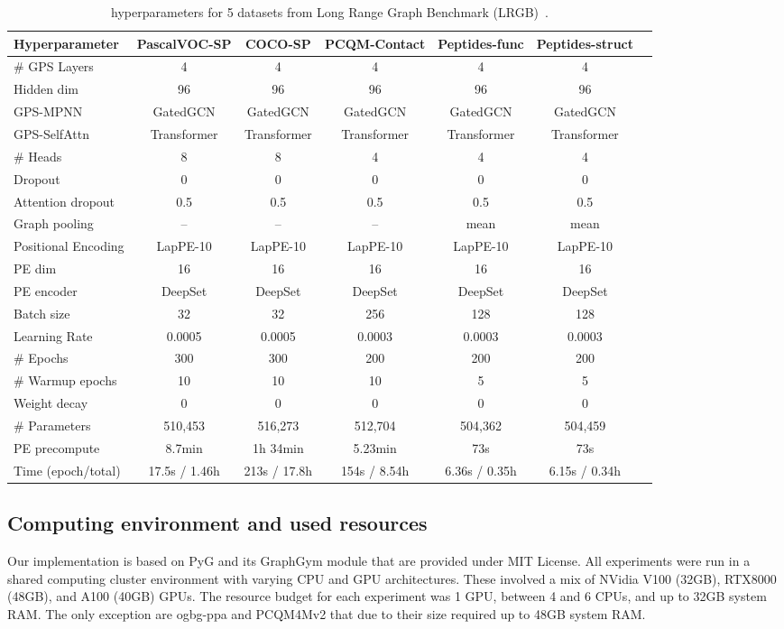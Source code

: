 \documentclass{article}
\begin{document}
\begin{table}[ht]
    \caption{\method hyperparameters for 5 datasets from Long Range Graph Benchmark (LRGB)~\cite{dwivedi2022LRGB}.}
    \label{tab:hparams_lrgb}
    \centering
    \fontsize{8.5pt}{8.5pt}\selectfont
    \begin{tabular}{lcccccc}\toprule
    Hyperparameter &\textbf{PascalVOC-SP} &\textbf{COCO-SP} &\textbf{PCQM-Contact} &\textbf{Peptides-func} &\textbf{Peptides-struct} \\\midrule
    \# GPS Layers &4 &4 &4 &4 &4 \\
    Hidden dim &96 &96 &96 &96 &96 \\
    GPS-MPNN &GatedGCN &GatedGCN &GatedGCN &GatedGCN &GatedGCN \\
    GPS-SelfAttn &Transformer &Transformer &Transformer &Transformer &Transformer \\
    \# Heads &8 &8 &4 &4 &4 \\
    Dropout &0 &0 &0 &0 &0 \\
    Attention dropout &0.5 &0.5 &0.5 &0.5 &0.5 \\
    Graph pooling &-- &-- &-- &mean &mean \\\midrule
    Positional Encoding &LapPE-10 &LapPE-10 &LapPE-10 &LapPE-10 &LapPE-10 \\
    PE dim &16 &16 &16 &16 &16 \\
    PE encoder &DeepSet &DeepSet &DeepSet &DeepSet &DeepSet \\\midrule
    Batch size &32 &32 &256 &128 &128 \\
    Learning Rate &0.0005 &0.0005 &0.0003 &0.0003 &0.0003 \\
    \# Epochs &300 &300 &200 &200 &200 \\
    \# Warmup epochs &10 &10 &10 &5 &5 \\
    Weight decay &0 &0 &0 &0 &0 \\\midrule
    \# Parameters &510,453 &516,273 &512,704 &504,362 &504,459 \\
    PE precompute &8.7min &1h 34min &5.23min &73s &73s \\
    Time (epoch/total) &17.5s / 1.46h &213s / 17.8h &154s / 8.54h &6.36s / 0.35h &6.15s / 0.34h \\
    \bottomrule
    \end{tabular}
\end{table}


\subsection{Computing environment and used resources}\label{app:cluster}
Our implementation is based on PyG and its GraphGym module \cite{FeyLenssen2019PyG,you2020design} that are provided under MIT License. All experiments were run in a shared computing cluster environment with varying CPU and GPU architectures. These involved a mix of NVidia V100 (32GB), RTX8000 (48GB), and A100 (40GB) GPUs. The resource budget for each experiment was 1 GPU, between 4 and 6 CPUs, and up to 32GB system RAM. The only exception are ogbg-ppa and PCQM4Mv2 that due to their size required up to 48GB system RAM.
\end{document}
